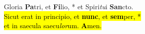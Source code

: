 Gloria \textbf{Pa}tri, et \textbf{Fi}lio, * et Spiri\emph{tu}i \textbf{San}cto. \\
\hl{Sicut erat in principio, et \textbf{nunc}, et \textbf{sem}per, *\\
et in saecula saecu\emph{lor}um. \textbf{A}men.}
